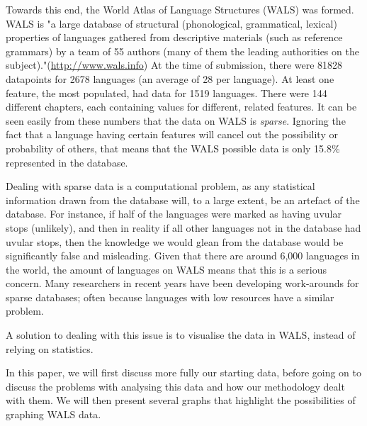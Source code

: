\documentclass[11pt]{article}
\begin{document}
Towards this end, the World Atlas of Language Structures (WALS) was formed. WALS is "a large database of structural (phonological, grammatical, lexical) properties of languages gathered from descriptive materials (such as reference grammars) by a team of 55 authors (many of them the leading authorities on the subject)."(\url{http://www.wals.info}) At the time of submission, there were 81828 datapoints for 2678 languages (an average of 28 per language). At least one feature, the most populated, had data for 1519 languages. There were 144 different chapters, each containing values for different, related features. It can be seen easily from these numbers that the data on WALS is {\it sparse}. Ignoring the fact that a language having certain features will cancel out the possibility or probability of others, that means that the WALS possible data is only 15.8\% represented in the database.

Dealing with sparse data is a computational problem, as any statistical information drawn from the database will, to a large extent, be an artefact of the database. For instance, if half of the languages were marked as having uvular stops (unlikely), and then in reality if all other languages not in the database had uvular stops, then the knowledge we would glean from the database would be significantly false and misleading. Given that there are around 6,000 languages in the world, the amount of languages on WALS means that this is a serious concern. Many researchers in recent years have been developing work-arounds for sparse databases; often because languages with low resources have a similar problem. %

A solution to dealing with this issue is to visualise the data in WALS, instead of relying on statistics.



In this paper, we will first discuss more fully our starting data, before going on to discuss the problems with analysing this data and how our methodology dealt with them. We will then present several graphs that highlight the possibilities of graphing WALS data. 
\end{document}
